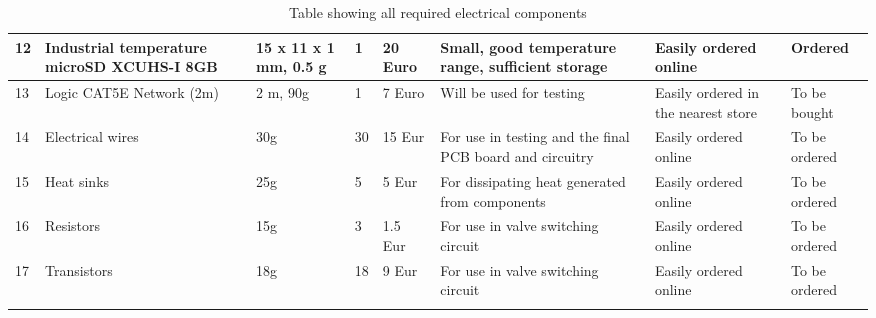 \begin{longtable}{|m{}|m{}|m{}|m{}|m{}|m{}|m{}|m{}|}
12 & Industrial temperature microSD XCUHS-I 8GB & 15 x 11 x 1 mm, 0.5 g & 1 & 20 Euro & Small, good temperature range, sufficient storage & Easily ordered online & Ordered  \\ \hline
13 & Logic CAT5E Network (2m) & 2 m, 90g & 1 & 7 Euro & Will be used for testing & Easily ordered in the nearest store & To be bought \\ \hline
14 & Electrical wires & 30g &  30 & 15 Eur & For use in testing and the final PCB board and circuitry & Easily ordered online & To be ordered \\ \hline
15 & Heat sinks & 25g &  5 &  5 Eur & For dissipating heat generated from components & Easily ordered online & To be ordered \\ \hline
16 & Resistors & 15g & 3 & 1.5 Eur & For use in valve switching circuit & Easily ordered online & To be ordered \\ \hline
17 & Transistors & 18g & 18 & 9 Eur &  For use in valve switching circuit & Easily ordered online & To be ordered \\ \hline 


    \caption{Table showing all required electrical components}
    \label{tab:electrical-components}
\end{longtable}
\raggedbottom
